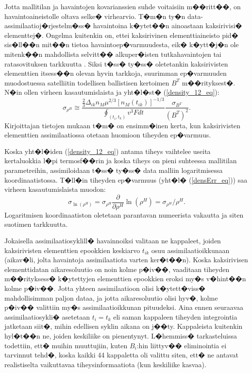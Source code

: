 \documentclass[12pt,a4paper,finnish,margin=2in]{article}
\begin{document}
Jotta mallitilan ja havaintojen kovarianssien suhde voitaisiin m��ritt��, on havaintoaineistolle oltava selke� virhearvio. T�m�n ty�n data-assimilaatioj�rjestelm�ss� havaintoina k�ytet��n ainoastaan kaksirivisi� elementtej�. Ongelma kuitenkin on, ettei kaksirivinen elementtiaineisto pid� sis�ll��n mit��n tietoa havaintoep�varmuudesta, eik� k�ytt�j�n ole mitenk��n mahdollista selvitt�� alkuper�isten tutkahavaintojen tai ratasovituksen tarkkuutta \citep{picone_2005}. Siksi t�ss� ty�ss� oletetankin kaksirivisten elementtien itsess��n olevan hyvin tarkkoja, suurimman ep�varmuuden muodostuessa satelliitin todellisen ballistisen kertoimen $B^T$ m��rityksest�. N�in ollen virheen kasautumislaista ja yht�l�st� (\ref{density_12_eq}):
\begin{equation} \label{densErr_eq}
\sigma_{\rho^H} \cong  \frac{\frac{2}{3} \Delta_{ik}n_M \mu^{2/3} \left [ n_M(t_{ik}) \right ]^{-1/3}}{\oint_{(t_i,t_k)}  v^3 F dt} \frac{\sigma_{B^T}}{(B^T)^2}.
\end{equation}
Kirjoittajan tietojen mukaan t�m� on ensimm�inen kerta, kun kaksirivisten elementtien assimilaatiossa otetaan huomioon tiheyden ep�varmuus. 

Koska yht�l�iden (\ref{density_12_eq}) antama tiheys vaihtelee useita kertaluokkia l�pi termosf��rin ja koska tiheys on pieni suhteessa mallitilan parametreihin, assimiloidaan t�ss� ty�ss� data malliin logaritmisessa koordinaatistossa. T�ll�in tiheyden ep�varmuus (yht�l� (\ref{densErr_eq})) saa virheen kasautumislaista muodon:
\begin{equation} \label{densErrLog_eq}
\sigma_{\ln(\rho^H)} = \sigma_{\rho^H} \frac{\partial}{\partial \rho^H} \ln(\rho^H) = \sigma_{\rho^H} / \rho^H.
\end{equation}
Logaritmisen koordinaatiston oletetaan parantavan numeerista vakautta ja siten suotimen tarkkuutta. 

Jokaisella assimilaatiosyklill� havainnoiksi valitaan ne kappaleet, joiden kaksirivisten elementtien epookkien keskiarvo $t_{ik}$ osuu assimilaatioikkunaan (aikav�li, jolta havaintoja assimilaatiota varten ker�t��n). Koska kaksirivisen elementtidatan aikaresoluutio on noin kolme p�iv��, vaaditaan tiheyden m��rityksess� k�ytettyjen elementtien epookkien eroksi my�s v�hint��n kolme p�iv��. Jotta yhteen assimilaatioon olisi k�ytett�viss� mahdollisimman paljon dataa, ja jotta aikaresoluutio olisi hyv�, kolme p�iv�� valittiin my�s assimilaatioikkunan pituudeksi. Aina ennen seuraavaa assimilaatiosykli� asetetaan $t_i = t_k$ eli saman kappaleen tiheyden integrointia jatketaan siit�, mihin edellisen syklin aikana on j��ty. Kappaleista kuitenkin hyl�t��n ne, joiden keskiliike on pienentynyt. L�hemmiss� tarkasteluissa todettiin, ett� muihin muuttujiin, kuten $B_i$:hin liittyv�� eliminointia ei tarvinnut tehd�, koska kaikki 44 kappaletta oli valittu siten, ett� ne antavat realistiselta vaikuttavaa tiheysinformaatiota (kun keskiliike kasvaa). 
\end{document}
